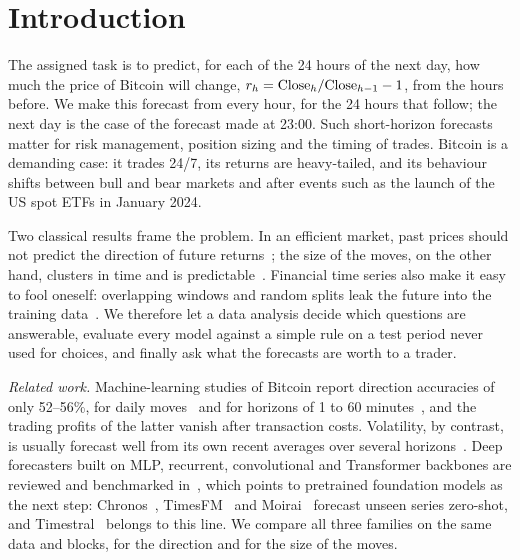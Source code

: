 \section{Introduction}
\label{sec:intro}

The assigned task is to predict, for each of the 24 hours of the next
day, how much the price of Bitcoin will change, $r_h =
\mathrm{Close}_h/\mathrm{Close}_{h-1}-1$, from the hours before. We
make this forecast from every hour, for the 24 hours that follow; the
next day is the case of the forecast made at 23:00. Such
short-horizon forecasts matter for risk management, position sizing and
the timing of trades. Bitcoin is a demanding case: it trades 24/7, its
returns are heavy-tailed, and its behaviour shifts between bull and bear
markets and after events such as the launch of the US spot ETFs in
January 2024.

Two classical results frame the problem. In an efficient market, past
prices should not predict the direction of future
returns~\cite{fama1970}; the size of the moves, on the other hand,
clusters in time and is predictable~\cite{engle1982,bollerslev1986}.
Financial time series also make it easy to fool oneself: overlapping
windows and random splits leak the future into the training
data~\cite{lopezdeprado2018}. We therefore let a data analysis decide
which questions are answerable, evaluate every model against a simple
rule on a test period never used for choices, and finally ask what the
forecasts are worth to a trader.

\emph{Related work.} Machine-learning studies of Bitcoin report
direction accuracies of only 52--56\%, for daily
moves~\cite{mcnally2018} and for horizons of 1 to 60
minutes~\cite{jaquart2021}, and the trading profits of the latter
vanish after transaction costs. Volatility, by contrast, is usually
forecast well from its own recent averages over several
horizons~\cite{corsi2009}. Deep forecasters built on MLP, recurrent,
convolutional and Transformer backbones are reviewed and benchmarked
in~\cite{wang2024deep}, which points to pretrained foundation models as
the next step: Chronos~\cite{ansari2024chronos},
TimesFM~\cite{das2024timesfm} and Moirai~\cite{woo2024moirai} forecast
unseen series zero-shot, and Timestral~\cite{timestral} belongs to this
line. We compare all three families on the same data and blocks, for
the direction and for the size of the moves.